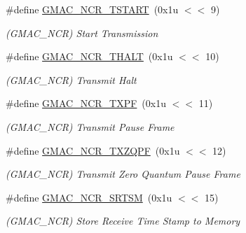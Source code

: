 \begin{DoxyCompactItemize}
\mbox{\label{group__SAME70__GMAC_gabe6db906a776de0f78a6d89ad1b115dc}} 
\#define \mbox{\hyperlink{group__SAME70__GMAC_gabe6db906a776de0f78a6d89ad1b115dc}{G\+M\+A\+C\+\_\+\+N\+C\+R\+\_\+\+T\+S\+T\+A\+RT}}~(0x1u $<$$<$ 9)
\begin{DoxyCompactList}\small\item\em (G\+M\+A\+C\+\_\+\+N\+CR) Start Transmission \end{DoxyCompactList}\item 
\mbox{\label{group__SAME70__GMAC_ga70dd4513f4ba0c993fa8340c199c7501}} 
\#define \mbox{\hyperlink{group__SAME70__GMAC_ga70dd4513f4ba0c993fa8340c199c7501}{G\+M\+A\+C\+\_\+\+N\+C\+R\+\_\+\+T\+H\+A\+LT}}~(0x1u $<$$<$ 10)
\begin{DoxyCompactList}\small\item\em (G\+M\+A\+C\+\_\+\+N\+CR) Transmit Halt \end{DoxyCompactList}\item 
\mbox{\label{group__SAME70__GMAC_ga7950fab2162c38ad4c12d09487dd03d5}} 
\#define \mbox{\hyperlink{group__SAME70__GMAC_ga7950fab2162c38ad4c12d09487dd03d5}{G\+M\+A\+C\+\_\+\+N\+C\+R\+\_\+\+T\+X\+PF}}~(0x1u $<$$<$ 11)
\begin{DoxyCompactList}\small\item\em (G\+M\+A\+C\+\_\+\+N\+CR) Transmit Pause Frame \end{DoxyCompactList}\item 
\mbox{\label{group__SAME70__GMAC_gae74e45b4d98ecdf2d7b628451cde1977}} 
\#define \mbox{\hyperlink{group__SAME70__GMAC_gae74e45b4d98ecdf2d7b628451cde1977}{G\+M\+A\+C\+\_\+\+N\+C\+R\+\_\+\+T\+X\+Z\+Q\+PF}}~(0x1u $<$$<$ 12)
\begin{DoxyCompactList}\small\item\em (G\+M\+A\+C\+\_\+\+N\+CR) Transmit Zero Quantum Pause Frame \end{DoxyCompactList}\item 
\mbox{\label{group__SAME70__GMAC_ga30eaf73d4146ad86ea0214402a27ed48}} 
\#define \mbox{\hyperlink{group__SAME70__GMAC_ga30eaf73d4146ad86ea0214402a27ed48}{G\+M\+A\+C\+\_\+\+N\+C\+R\+\_\+\+S\+R\+T\+SM}}~(0x1u $<$$<$ 15)
\begin{DoxyCompactList}\small\item\em (G\+M\+A\+C\+\_\+\+N\+CR) Store Receive Time Stamp to Memory \end{DoxyCompactList}\item 
$$
\end{DoxyCompactItemize}
